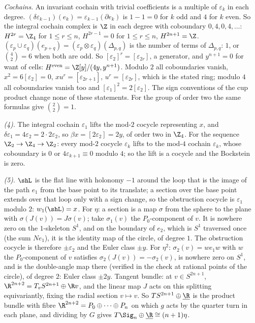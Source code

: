 \emph{Cochains.} An invariant cochain with trivial coefficients is a multiple of $\varepsilon_{k}$ in each degree. $(\delta\varepsilon_{k-1})(e_{k}) = \varepsilon_{k-1}(\partial e_{k})$ is $1 - 1 = 0$ for $k$ odd and $4$ for $k$ even. So the integral cochain complex is $\Z$ in each degree with coboundary $0, 4, 0, 4, \dots$: $H^{2r} = \Z_{4}$ for $1 \leq r \leq n$, $H^{2r-1} = 0$ for $1 \leq r \leq n$, $H^{2n+1} = \Z$. $(\varepsilon_{p} \cup \varepsilon_{q})(e_{p+q}) = (\varepsilon_{p} \otimes \varepsilon_{q})(\Delta_{p,q})$ is the number of terms of $\Delta_{p,q}$: $1$, or $\binom{4}{2} = 6$ when both are odd. So $[\varepsilon_{2}]^{r} = [\varepsilon_{2r}]$, a generator, and $y^{n+1} = 0$ for want of cells: $H^{\mathrm{even}} = \Z[y]/(4y, y^{n+1})$. Modulo $2$ all coboundaries vanish, $x^{2} = 6[\varepsilon_{2}] = 0$, $xu^{r} = [\varepsilon_{2r+1}]$, $u^{r} = [\varepsilon_{2r}]$, which is the stated ring; modulo $4$ all coboundaries vanish too and $[\varepsilon_{1}]^{2} = 2[\varepsilon_{2}]$. The sign conventions of the cup product change none of these statements. For the group of order two the same formulas give $\binom{2}{2} = 1$.

\emph{(4).} The integral cochain $\varepsilon_{1}$ lifts the mod-$2$ cocycle representing $x$, and $\delta\varepsilon_{1} = 4\varepsilon_{2} = 2 \cdot 2\varepsilon_{2}$, so $\beta x = [2\varepsilon_{2}] = 2y$, of order two in $\Z_{4}$. For the sequence $\Z_{2} \to \Z_{4} \to \Z_{2}$: every mod-$2$ cocycle $\varepsilon_{k}$ lifts to the mod-$4$ cochain $\varepsilon_{k}$, whose coboundary is $0$ or $4\varepsilon_{k+1} \equiv 0$ modulo $4$; so the lift is a cocycle and the Bockstein is zero.

\emph{(5).} $\shL$ is the flat line with holonomy $-1$ around the loop that is the image of the path $e_{1}$ from the base point to its translate; a section over the base point extends over that loop only with a sign change, so the obstruction cocycle is $\varepsilon_{1}$ modulo $2$: $w_{1}(\shL) = x$. For $\eta$: a section is a map $\sigma$ from the sphere to the plane with $\sigma(J(v)) = J\sigma(v)$; take $\sigma_{1}(v)$ the $P_{0}$-component of $v$. It is nowhere zero on the $1$-skeleton $S^{1}$, and on the boundary of $e_{2}$, which is $S^{1}$ traversed once (the sum $Ne_{1}$), it is the identity map of the circle, of degree $1$. The obstruction cocycle is therefore $\pm\varepsilon_{2}$ and the Euler class $\pm y$. For $\eta^{2}$: $\sigma_{2}(v) = w e_{1} w$ with $w$ the $P_{0}$-component of $v$ satisfies $\sigma_{2}(J(v)) = -\sigma_{2}(v)$, is nowhere zero on $S^{1}$, and is the double-angle map there (verified in the check at rational points of the circle), of degree $2$: Euler class $\pm 2y$. Tangent bundle: at $v \in S^{2n+1}$, $\R^{2n+2} = T_{v}S^{2n+1} \oplus \R v$, and the linear map $J$ acts on this splitting equivariantly, fixing the radial section $v \mapsto v$. So $TS^{2n+1} \oplus \underline{\R}$ is the product bundle with fibre $\R^{2n+2} = P_{0} \oplus \dots \oplus P_{n}$ on which $g$ acts by the quarter turn in each plane, and dividing by $G$ gives $T\Sig_{n} \oplus \underline{\R} \cong (n+1)\eta$.

